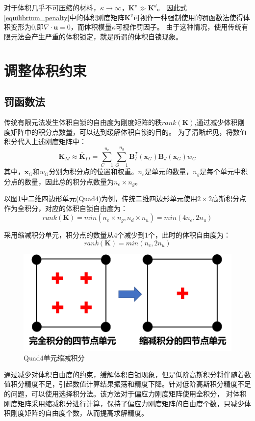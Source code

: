 对于体积几乎不可压缩的材料，$\kappa \rightarrow \infty$，$\boldsymbol K^v \gg \boldsymbol K^d $。
因此式\eqref{equilibrium_penalty}中的体积刚度矩阵$\boldsymbol K^v$可视作一种强制使用的罚函数法使得体积变形为$0$,即$\nabla \cdot \boldsymbol u = 0$，而体积模量$\kappa$可视作罚因子。
由于这种情况，使用传统有限元法会产生严重的体积锁定，就是所谓的体积自锁现象。


\section{调整体积约束}
\subsection{罚函数法}
传统有限元法发生体积自锁的自由度为刚度矩阵的秩$rank(\boldsymbol K)$,通过减少体积刚度矩阵中的积分点数量，可以达到缓解体积自锁的目的。
为了清晰起见，将数值积分代入上述刚度矩阵中：
\begin{equation}
    \boldsymbol K_{IJ} \approx \bar{\boldsymbol K}_{IJ} = \sum_{C=1}^{n_e}\sum_{G=1}^{n_g} \boldsymbol B^{T}_I(\boldsymbol x_G) \boldsymbol B_J(\boldsymbol x_G) w_G
\end{equation}
其中，$\boldsymbol x_G$和$w_G$分别为积分点的位置和权重。$n_e$是单元的数量，$n_g$是每个单元中积分点的数量，因此总的积分点数量为$n_e \times n_g$。

以图\ref{reduced}中二维四边形单元(Quad4)为例，传统二维四边形单元使用$2\times2$高斯积分点作为全积分，对应的体积自锁自由度为：
\begin{equation}
    rank(\boldsymbol K)=min(n_e \times n_g,n_d \times n_u)=min(4n_e,2n_u)
\end{equation}

采用缩减积分单元，积分点的数量从4个减少到1个，此时的体积自由度为：
\begin{equation}
    rank(\boldsymbol K)=min(n_e,2n_u)
\end{equation}
\begin{figure}[H]
    \centering 
    \includegraphics[scale=0.8]{figures/reduced.png}
    \caption{Quad4单元缩减积分}\label{reduced}
\end{figure}
通过减少对体积自由度的约束，缓解体积自锁现象，但是低阶高斯积分将伴随着数值积分精度不足，引起数值计算结果振荡和精度下降。针对低阶高斯积分精度不足的问题，可以使用选择积分法。该方法对于偏应力刚度矩阵使用全积分，
对体积刚度矩阵采用缩减积分进行计算，保持了偏应力刚度矩阵的自由度个数，只减少体积刚度矩阵的自由度个数，从而提高求解精度。

